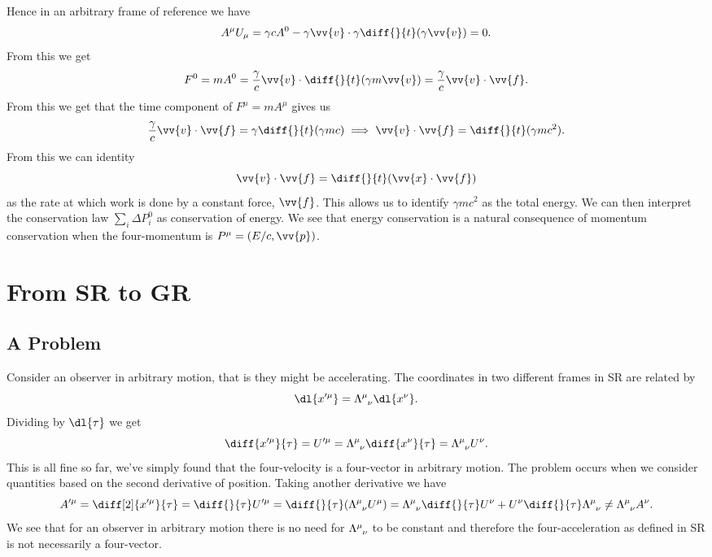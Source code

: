 \documentclass[fleqn]{NotesClass}
\begin{document}
    Hence in an arbitrary frame of reference we have
    \begin{equation}
        A^\mu U_\mu = \gamma c A^0 - \gamma \vv{v} \cdot \gamma \diff{}{t} (\gamma\vv{v}) = 0.
    \end{equation}
    From this we get
    \begin{equation}
        F^0 = mA^0 = \frac{\gamma}{c}\vv{v} \cdot \diff{}{t}(\gamma m\vv{v}) = \frac{\gamma}{c}\vv{v} \cdot \vv{f}.
    \end{equation}
    From this we get that the time component of \(F^\mu = mA^\mu\) gives us
    \begin{equation}
        \frac{\gamma}{c}\vv{v} \cdot \vv{f} = \gamma \diff{}{t}(\gamma m c) \implies \vv{v} \cdot \vv{f} = \diff{}{t}(\gamma mc^2).
    \end{equation}
    From this we can identity
    \begin{equation}
        \vv{v} \cdot \vv{f} = \diff{}{t}(\vv{x} \cdot \vv{f})
    \end{equation}
    as the rate at which work is done by a constant force, \(\vv{f}\).
    This allows us to identify \(\gamma mc^2\) as the total energy.
    We can then interpret the conservation law \(\sum_i \Delta P_i^0\) as conservation of energy.
    We see that energy conservation is a natural consequence of momentum conservation when the four-momentum is \(P^\mu = (E/c, \vv{p})\).
    
    \chapter{From SR to GR}
    \section{A Problem}
    Consider an observer in arbitrary motion, that is they might be accelerating.
    The coordinates in two different frames in SR are related by
    \begin{equation}
        \dl{x'^\mu} = \tensor{\Lambda}{^\mu_\nu} \dl{x^\nu}.
    \end{equation}
    Dividing by \(\dl{\tau}\) we get
    \begin{equation}
        \diff{x'^\mu}{\tau} = U'^\mu = \tensor{\Lambda}{^\mu_\nu} \diff{x^\nu}{\tau} = \tensor{\Lambda}{^\mu_\nu}U^\nu.
    \end{equation}
    This is all fine so far, we've simply found that the four-velocity is a four-vector in arbitrary motion.
    The problem occurs when we consider quantities based on the second derivative of position.
    Taking another derivative we have
    \begin{equation}
        A'^\mu = \diff[2]{x'^\mu}{\tau} = \diff{}{\tau}U'^\mu = \diff{}{\tau}(\tensor{\Lambda}{^\mu_\nu} U^\mu) = \tensor{\Lambda}{^\mu_\nu}\diff{}{\tau} U^\nu +  U^\nu\diff{}{\tau} \tensor{\Lambda}{^\mu_\nu} \ne \tensor{\Lambda}{^\mu_\nu}A^\nu.
    \end{equation}
    We see that for an observer in arbitrary motion there is no need for \(\tensor{\Lambda}{^\mu_\nu}\) to be constant and therefore the four-acceleration as defined in SR is not necessarily a four-vector.
    
\end{document}
